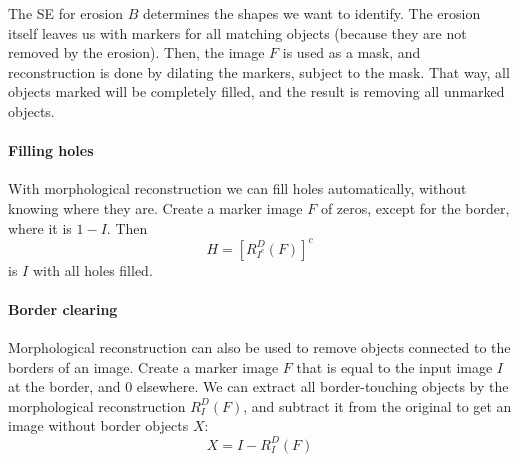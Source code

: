 The SE for erosion $B$ determines the shapes we want to identify. The erosion itself leaves us with markers for all matching objects (because they are not removed by the erosion). Then, the image $F$ is used as a mask, and reconstruction is done by dilating the markers, subject to the mask. That way, all objects marked will be completely filled, and the result is removing all unmarked objects.

\paragraph{Filling holes}
With morphological reconstruction we can fill holes automatically, without knowing where they are. Create a marker image $F$ of zeros, except for the border, where it is $1 - I$. Then
\begin{equation}
    H = \left[ R_{I^c}^D(F) \right]^c
\end{equation}
is $I$ with all holes filled.

\paragraph{Border clearing}
Morphological reconstruction can also be used to remove objects connected to the borders of an image. Create a marker image $F$ that is equal to the input image $I$ at the border, and 0 elsewhere. We can extract all border-touching objects by the morphological reconstruction $R_I^D(F)$, and subtract it from the original to get an image without border objects $X$:
\begin{equation}
    X = I - R_I^D(F)
\end{equation}

